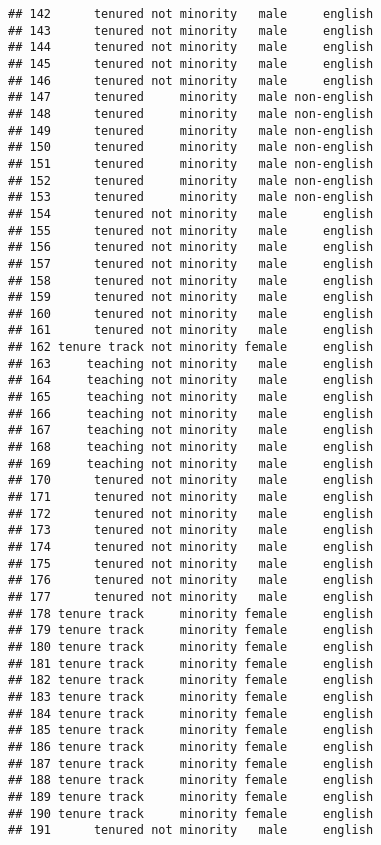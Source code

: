 \documentclass[
]{article}
\begin{document}
\begin{verbatim}
## 142      tenured not minority   male     english
## 143      tenured not minority   male     english
## 144      tenured not minority   male     english
## 145      tenured not minority   male     english
## 146      tenured not minority   male     english
## 147      tenured     minority   male non-english
## 148      tenured     minority   male non-english
## 149      tenured     minority   male non-english
## 150      tenured     minority   male non-english
## 151      tenured     minority   male non-english
## 152      tenured     minority   male non-english
## 153      tenured     minority   male non-english
## 154      tenured not minority   male     english
## 155      tenured not minority   male     english
## 156      tenured not minority   male     english
## 157      tenured not minority   male     english
## 158      tenured not minority   male     english
## 159      tenured not minority   male     english
## 160      tenured not minority   male     english
## 161      tenured not minority   male     english
## 162 tenure track not minority female     english
## 163     teaching not minority   male     english
## 164     teaching not minority   male     english
## 165     teaching not minority   male     english
## 166     teaching not minority   male     english
## 167     teaching not minority   male     english
## 168     teaching not minority   male     english
## 169     teaching not minority   male     english
## 170      tenured not minority   male     english
## 171      tenured not minority   male     english
## 172      tenured not minority   male     english
## 173      tenured not minority   male     english
## 174      tenured not minority   male     english
## 175      tenured not minority   male     english
## 176      tenured not minority   male     english
## 177      tenured not minority   male     english
## 178 tenure track     minority female     english
## 179 tenure track     minority female     english
## 180 tenure track     minority female     english
## 181 tenure track     minority female     english
## 182 tenure track     minority female     english
## 183 tenure track     minority female     english
## 184 tenure track     minority female     english
## 185 tenure track     minority female     english
## 186 tenure track     minority female     english
## 187 tenure track     minority female     english
## 188 tenure track     minority female     english
## 189 tenure track     minority female     english
## 190 tenure track     minority female     english
## 191      tenured not minority   male     english

\end{verbatim}
\end{document}
